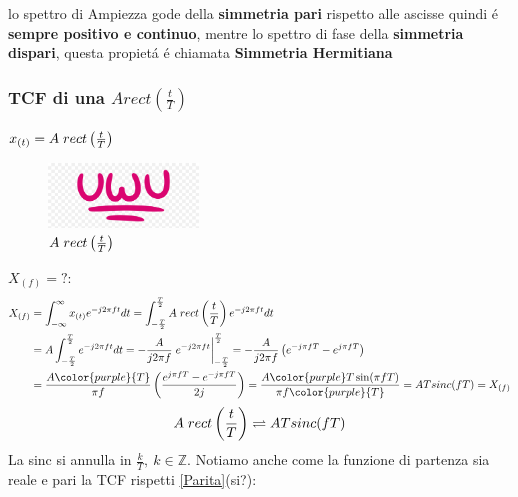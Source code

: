         lo spettro di Ampiezza gode della \textbf{simmetria pari} rispetto alle ascisse quindi é \textbf{sempre positivo e continuo}, mentre lo spettro di fase della \textbf{simmetria dispari}, 
        questa propietá é chiamata \textbf{Simmetria Hermitiana}

        \subsubsection{TCF di una $Arect\left(\frac{t}{T}\right)$}
            $x_{(t)} = A\hspace{0.1cm}rect\left(\frac{t}{T}\right)$
            \begin{figure}[H]
                \centering
                \includegraphics[width=4cm]{media/uwu.png}
                \caption{$A\hspace{0.1cm}rect\left(\frac{t}{T}\right)$}
                \label{fig:grafo rect nella tcf}
            \end{figure}
            $X_{(f)} = ? :$
            \begin{align}
                X_{(f)} & = \int_{-\infty}^{\infty} x_{(t)} e^{-j2\pi ft} dt \nonumber = \int_{-\frac{T}{2}}^{\frac{T}{2}} A\hspace{0.1cm}rect\left(\frac{t}{T}\right) e^{-j2\pi ft} dt \nonumber\\ 
                        & = A \int_{-\frac{T}{2}}^{\frac{T}{2}} e^{-j2\pi ft} dt = -\frac{A}{j2\pi f} \eval{e^{-j2\pi ft}}_{-\frac{T}{2}}^{\frac{T}{2}} =-\frac{A}{j2\pi f} \left(e^{-j\pi fT} - e^{j\pi fT}\right) \nonumber\\
                        & = \frac{A\color{purple}{T}}{\pi f} \left(\frac{e^{j\pi fT} - e^{-j\pi fT}}{2j}\right) = \frac{A{\color{purple}T}\sin(\pi fT)}{\pi f\color{purple}{T}} = AT sinc(fT) =  X_{(f)} \nonumber 
            \end{align}
            \[
                A\hspace{0.1cm}rect\left(\frac{t}{T}\right) \rightleftharpoons AT sinc(fT)
            \]
            La sinc si annulla in $\frac{k}{T},\ k\in \mathbb{Z}$. Notiamo anche come la funzione di partenza sia reale e pari la TCF rispetti \ref{Parita}(si?):
